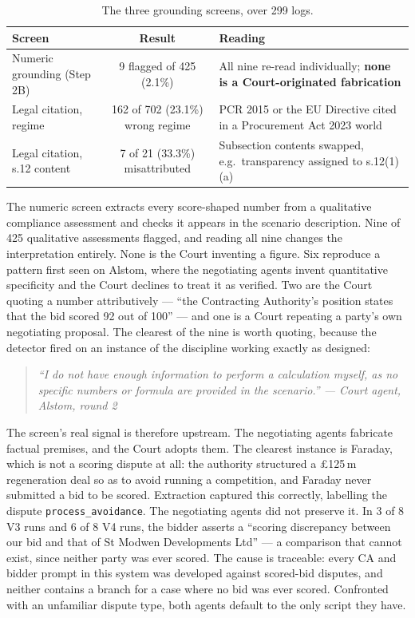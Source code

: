 \begin{table}[htbp]
\centering
\footnotesize
\caption[Fabrication screens]{The three grounding screens, over 299 logs.}
\label{tab:fabrication}
\begin{tabular}{@{}lcp{6.2cm}@{}}
\toprule
\textbf{Screen} & \textbf{Result} & \textbf{Reading} \\
\midrule
Numeric grounding (Step 2B) & 9 flagged of 425 (2.1\%) &
  All nine re-read individually; \textbf{none is a Court-originated fabrication} \\
Legal citation, regime & 162 of 702 (23.1\%) wrong regime &
  PCR 2015 or the EU Directive cited in a Procurement Act 2023 world \\
Legal citation, s.12 content & 7 of 21 (33.3\%) misattributed &
  Subsection contents swapped, e.g.\ transparency assigned to s.12(1)(a) \\
\bottomrule
\end{tabular}
\end{table}

The numeric screen extracts every score-shaped number from a qualitative
compliance assessment and checks it appears in the scenario description. Nine of
425 qualitative assessments flagged, and reading all nine changes the
interpretation entirely. None is the Court inventing a figure. Six reproduce a
pattern first seen on Alstom, where the negotiating agents invent quantitative
specificity and the Court declines to treat it as verified. Two are the Court
quoting a number attributively --- ``the Contracting Authority's position states
that the bid scored 92 out of 100'' --- and one is a Court repeating a party's own
negotiating proposal. The clearest of the nine is worth quoting, because the
detector fired on an instance of the discipline working exactly as designed:

\begin{quote}\itshape\small
``I do not have enough information to perform a calculation myself, as no specific
numbers or formula are provided in the scenario.''
\hfill --- Court agent, Alstom, round 2
\end{quote}

The screen's real signal is therefore upstream. The negotiating agents fabricate
factual premises, and the Court adopts them. The clearest instance is Faraday,
which is not a scoring dispute at all: the authority structured a
\pounds125\,m regeneration deal so as to avoid running a competition, and Faraday
never submitted a bid to be scored. Extraction captured this correctly, labelling
the dispute \texttt{process\_avoidance}. The negotiating agents did not preserve
it. In 3 of 8 V3 runs and 6 of 8 V4 runs, the bidder asserts a ``scoring
discrepancy between our bid and that of St Modwen Developments Ltd'' --- a
comparison that cannot exist, since neither party was ever scored. The cause is
traceable: every CA and bidder prompt in this system was developed against
scored-bid disputes, and neither contains a branch for a case where no bid was
ever scored. Confronted with an unfamiliar dispute type, both agents default to
the only script they have.

